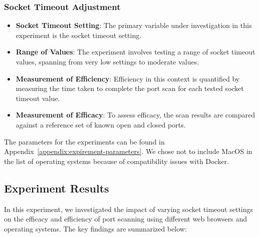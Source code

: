 \subsubsection{Socket Timeout Adjustment}

\begin{itemize}
  \item \textbf{Socket Timeout Setting}: The primary variable under investigation in this experiment is the socket timeout setting.
  
  \item \textbf{Range of Values}: The experiment involves testing a range of socket timeout values, spanning from very low settings to moderate values.
  
  \item \textbf{Measurement of Efficiency}: Efficiency in this context is quantified by measuring the time taken to complete the port scan for each tested socket timeout value.
  
  \item \textbf{Measurement of Efficacy}: To assess efficacy, the scan results are compared against a reference set of known open and closed ports.
\end{itemize}

The parameters for the experiments can be found in Appendix~\ref{appendix:expirement-parameters}. 
We chose not to include MacOS in the list of operating systems because of compatibility issues with Docker.




\subsection{Experiment Results}

In this experiment, we investigated the impact of varying socket timeout settings on the efficacy and efficiency of port scanning using different web browsers and operating systems. The key findings are summarized below:

